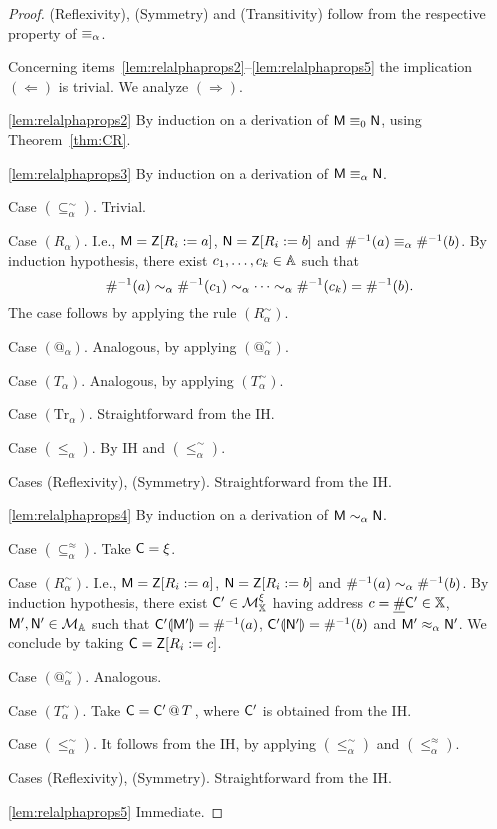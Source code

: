\begin{proof}
(Reflexivity), (Symmetry) and (Transitivity) follow from the respective property of $\eq$.

Concerning items~\ref{lem:relalphaprops2}--\ref{lem:relalphaprops5} the implication $(\Leftarrow)$ is trivial. We analyze $(\Rightarrow)$.

\ref{lem:relalphaprops2} %
	By induction on a derivation of $\mM\eq[0]\mN$, using Theorem~\ref{thm:CR}.

\ref{lem:relalphaprops3} %
    By induction on a derivation of $\mM\eq\mN$.

    Case $(\subseteq^\sim_\alpha)$. Trivial.

    Case $(R_\alpha)$. I.e., $\mM = \mZ\repl{R_i}{a}$, $\mN = \mZ\repl{R_i}{b}$ and $\Lookinv{a} \eq \Lookinv{b}$. By induction hypothesis, there exist $c_1,\dots,c_k\in\Addrs$ such that
    \[
    	\Lookinv{a}\svirg\Lookinv{c_1}\svirg\cdots\svirg\Lookinv{c_k}=\Lookinv{b}.
    \]
    The case follows by applying the rule $(R^\sim_\alpha)$.

    Case $(@_\alpha)$. Analogous, by applying $(@^\sim_\alpha)$.

    Case $(T_\alpha)$. Analogous, by applying $(T^\sim_\alpha)$.

    Case $(\mathrm{Tr}_\alpha)$. Straightforward from the IH\@.

    Case $(\le_\alpha)$. By IH and $(\le^\sim_\alpha)$.

	Cases (Reflexivity), (Symmetry). Straightforward from the IH\@.

\ref{lem:relalphaprops4} %
	By induction on a derivation of $\mM\svirg\mN$.

	Case $(\subseteq^\approx_\alpha)$. Take $\C = \xi$.

	Case $(R^\sim_\alpha)$. I.e., $\mM = \mZ\repl{R_i}{a}$, $\mN = \mZ\repl{R_i}{b}$ and $\Lookinv{a} \svirg \Lookinv{b}$. By induction hypothesis, there exist $\C'\in\cMX$ having address $c = \Lup{\C'}\in\XX$, $\mM',\mN'\in\cM$ such that $\C'\hole{\mM'} = \Lookinv{a}$, $\C'\hole{\mN'} = \Lookinv{b}$ and $\mM' \pesc\mN'$. We conclude by taking $\C = \mZ\repl{R_i}{c}$.

	Case $(@^\sim_\alpha)$. Analogous.

	Case $(T^\sim_\alpha)$. Take $\C = \appT{\C'}{T}$, where $\C'$ is obtained from the IH\@.

	Case $(\le^\sim_\alpha)$. It follows from the IH, by applying $(\le^\sim_\alpha)$ and $(\le^\approx_\alpha)$.

	Cases (Reflexivity), (Symmetry). Straightforward from the IH\@.

\ref{lem:relalphaprops5} Immediate. %
\end{proof}


